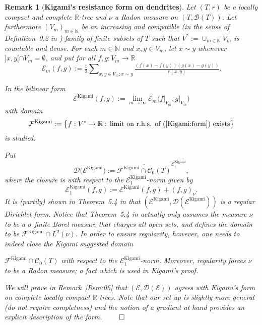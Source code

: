 \documentclass[11pt]{amsart}
\numberwithin{equation}{section}
\newtheorem{remark}[definition]{Remark}
\begin{document}
{
\begin{remark}[\bf Kigami's resistance form on dendrites] \rm Let $(T,r)$ be a locally compact and complete ${{\mathbb R}}$-tree and $\nu$ a Radon measure on $(T,{\mathcal B}(T))$. Let furthermore $(V_m)_{m\in\mathbb{N}}$ be an increasing
and compatible (in the sense of Definition~0.2 in \cite{Kigami95}) family of finite subsets of $T$ such that $V^\ast:=\cup_{m\in\mathbb{N}}V_m$ is
countable and dense. For each $m\in\mathbb{N}$ and $x,y\in V_m$, let
$x\sim y$ whenever $]x,y[\cap V_m=\emptyset$, and put for all $f,g:V_m\to{{\mathbb R}}$
\begin{equation}
\label{Kigami:m}
   {\mathcal E}_m(f,g)
 :=
   \tfrac{1}{2}\sum\nolimits_{x,y\in V_m;x\sim y}\tfrac{(f(x)-f(y))(g(x)-g(y))}{r(x,y)}.
\end{equation}

In \cite{Kigami95} the bilinear form
\begin{equation}
\label{Kigami:form}
   {\mathcal E}^{\mathrm{Kigami}}(f,g)
 :=
   \lim_{m\to\infty}{\mathcal E}_m\big(f\big|_{V_m},g\big|_{V_m}\big)
\end{equation}
with domain
\begin{equation}
\label{Kigami:label}
   {\mathcal F}^{\mathrm{Kigami}}
 :=
   \big\{f:V^\ast\to\mathbb{R}:\,\mbox{limit on r.h.s. of (\ref{Kigami:form}) exists}\big\}
\end{equation}
is studied.

Put
\begin{equation}
\label{Kigami:labelD}
{\mathcal D}\big({\mathcal E}^{\mathrm{Kigami}}\big) := \overline{ {\mathcal F}^{\mathrm{Kigami}} \cap  {\mathcal C}_0(T)} ^{{\mathcal E}^{\mathrm{Kigami}}_{1}},
\end{equation}
where the closure is with respect  to the ${\mathcal E}^{\mathrm{Kigami}}_1$-norm given by
\begin{equation}
\label{e:024}
   {\mathcal E}^{\mathrm{Kigami}}_{1}(f,g):={\mathcal E}^{\mathrm{Kigami}}(f,g) + (f,g)_\nu.
\end{equation}
It is (partily) shown in
Theorem~5.4 in \cite{Kigami95} that $({\mathcal E}^{\mathrm{Kigami}},{\mathcal D}({\mathcal E}^{\mathrm{Kigami}}))$
is a regular Dirichlet form.
Notice that Theorem~5.4 in \cite{Kigami95} actually only assumes the measure $\nu$ to be a $\sigma$-finite Borel measure that charges all open sets,
and defines the domain to be  ${\mathcal F}^{\mathrm{Kigami}} \cap L^{2}(\nu)$.
In order to ensure regularity, however, one needs to indeed close the  Kigami suggested domain
 
$ {\mathcal F}^{\mathrm{Kigami}} \cap{\mathcal C}_0(T)$ with respect to the  ${\mathcal E}^{\mathrm{Kigami}}_1$-norm. Moreover, regularity forces
$\nu$ to be a Radon measure; a fact which is used in Kigami's proof.

We will prove  in Remark~\ref{Rem:05} that $({\mathcal E},{\mathcal D}({\mathcal E}))$ agrees with Kigami's form on complete locally compact ${{\mathbb R}}$-trees. Note that our set-up is slightly more general (do not require completness) and the notion of a gradient at hand provides an explicit description of the form. 
\label{Rem:03}
\hfill$\qed$
\end{remark}{\smallskip}
}
\end{document}
